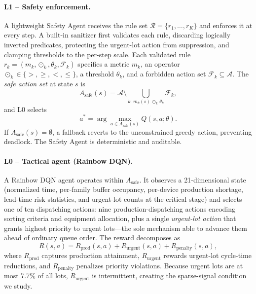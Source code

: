 \documentclass[letterpaper]{article} %
\begin{document}
\paragraph{L1 -- Safety enforcement.}
A lightweight Safety Agent receives the rule set
$\mathcal{R}=\{r_1,\dots,r_K\}$ and enforces it at every step. A built-in
sanitizer first validates each rule, discarding logically inverted predicates,
protecting the urgent-lot action from suppression, and clamping thresholds to the
per-step scale. Each validated rule $r_k=(m_k,\odot_k,\theta_k,\mathcal{F}_k)$
specifies a metric $m_k$, an operator $\odot_k\in\{>,\geq,<,\leq\}$, a threshold
$\theta_k$, and a forbidden action set $\mathcal{F}_k\subseteq\mathcal{A}$. The
\emph{safe action set} at state $s$ is
\begin{equation}
  A_{\text{safe}}(s)=\mathcal{A}\setminus
  \bigcup_{k:\,m_k(s)\,\odot_k\,\theta_k}\mathcal{F}_k,
  \label{eq:mask}
\end{equation}
and L0 selects
\begin{equation}
  a^{*}=\arg\max_{a\in A_{\text{safe}}(s)} Q(s,a;\theta).
  \label{eq:constrained}
\end{equation}
If $A_{\text{safe}}(s)=\emptyset$, a fallback reverts to the unconstrained greedy
action, preventing deadlock. The Safety Agent is deterministic and auditable.

\paragraph{L0 -- Tactical agent (Rainbow DQN).}
A Rainbow DQN agent \citep{hessel2018} operates within $A_{\text{safe}}$. It
observes a 21-dimensional state (normalized time, per-family buffer occupancy,
per-device production shortage, lead-time risk statistics, and urgent-lot counts
at the critical stage) and selects one of ten dispatching actions: nine
production-dispatching actions encoding sorting criteria and equipment
allocation, plus a single \emph{urgent-lot action} that grants highest priority
to urgent lots---the sole mechanism able to advance them ahead of ordinary queue
order. The reward decomposes as
\begin{equation}
  R(s,a)=R_{\text{prod}}(s,a)+R_{\text{urgent}}(s,a)+R_{\text{penalty}}(s,a),
  \label{eq:reward}
\end{equation}
where $R_{\text{prod}}$ captures production attainment, $R_{\text{urgent}}$
rewards urgent-lot cycle-time reductions, and $R_{\text{penalty}}$ penalizes
priority violations. Because urgent lots are at most 7.7\% of all lots,
$R_{\text{urgent}}$ is intermittent, creating the sparse-signal condition we
study.
\end{document}
